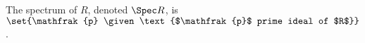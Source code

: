 The spectrum of $R$, denoted $\Spec R$, is $\set{\mathfrak{p} \given\text{$\mathfrak{p}$ prime ideal of $R$}}$.
